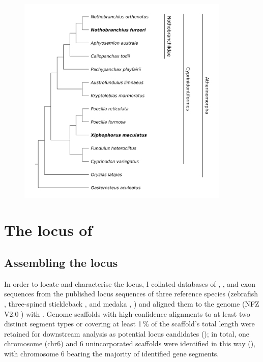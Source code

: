 \begin{figure}
	\centering
	\includegraphics[width=0.9\textwidth]{_Figures/png/species-tree-large-taxa}
	\label{fig:species-tree-large-taxa}
\end{figure}

\section{The \igh{} locus of \nfu}
\label{sec:nfu-locus}

\subsection{Assembling the \Nfu \igh{} locus}
\label{sec:nfu-locus-assembly}

In order to locate and characterise the \nfu \igh{} locus, I collated databases of \vh, \jh, and \ch exon sequences from the published locus sequences of three reference species (zebrafish \parencite{danilova2005zebrafish}, three-spined stickleback \parencite{bao2010stickleback,gambondeza2011stickleback}, and medaka \parencite{magadan2011medaka}, ) and aligned them to the \nfu genome (NFZ V2.0 \parencite{willemsen2019popgen}) with  \parencite{altschul1990blast,altschul1997blast}. Genome scaffolds with high-confidence alignments to at least two distinct segment types or covering at least 1\,\% of the scaffold's total length were retained for downstream analysis as potential locus candidates (); in total, one chromosome (chr6) and 6 unincorporated scaffolds were identified in this way (), with chromosome 6 bearing the majority of identified gene segments.

